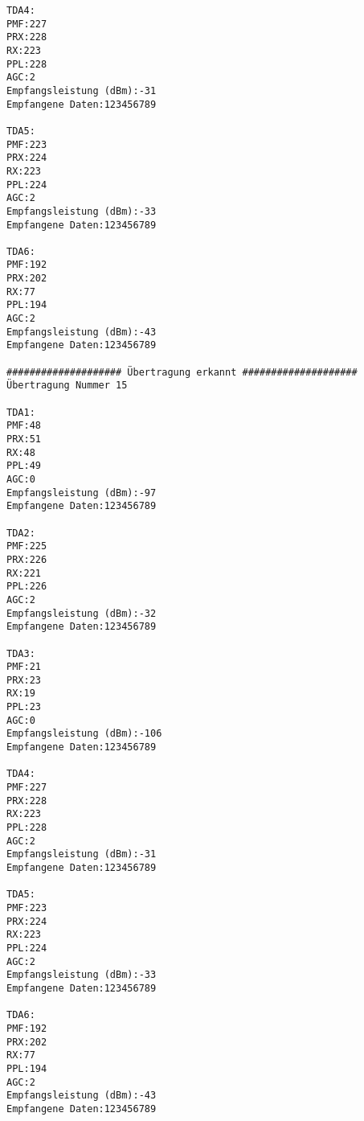 \begin{lstlisting}[nolol=true,caption={Ausgabe des ersten Feldtests in der Konsole},label={listing:Feldtest1},captionpos=t]
TDA4:
PMF:227
PRX:228
RX:223
PPL:228
AGC:2
Empfangsleistung (dBm):-31
Empfangene Daten:123456789

TDA5:
PMF:223
PRX:224
RX:223
PPL:224
AGC:2
Empfangsleistung (dBm):-33
Empfangene Daten:123456789

TDA6:
PMF:192
PRX:202
RX:77
PPL:194
AGC:2
Empfangsleistung (dBm):-43
Empfangene Daten:123456789

#################### Übertragung erkannt ####################
Übertragung Nummer 15

TDA1:
PMF:48
PRX:51
RX:48
PPL:49
AGC:0
Empfangsleistung (dBm):-97
Empfangene Daten:123456789

TDA2:
PMF:225
PRX:226
RX:221
PPL:226
AGC:2
Empfangsleistung (dBm):-32
Empfangene Daten:123456789

TDA3:
PMF:21
PRX:23
RX:19
PPL:23
AGC:0
Empfangsleistung (dBm):-106
Empfangene Daten:123456789

TDA4:
PMF:227
PRX:228
RX:223
PPL:228
AGC:2
Empfangsleistung (dBm):-31
Empfangene Daten:123456789

TDA5:
PMF:223
PRX:224
RX:223
PPL:224
AGC:2
Empfangsleistung (dBm):-33
Empfangene Daten:123456789

TDA6:
PMF:192
PRX:202
RX:77
PPL:194
AGC:2
Empfangsleistung (dBm):-43
Empfangene Daten:123456789



\end{lstlisting}



